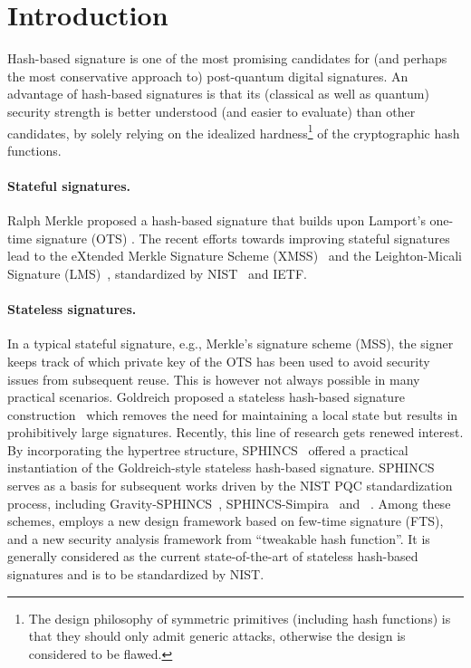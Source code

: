 \section{Introduction} \label{sec:intro}

Hash-based signature is one of the most promising candidates for (and perhaps the most conservative approach to)  post-quantum digital signatures. An advantage of hash-based signatures is that its (classical as well as quantum) security strength is better understood (and easier to evaluate) than other candidates, by solely relying on the idealized hardness\footnote{The design philosophy of symmetric primitives (including hash functions) is that they should only admit generic attacks, otherwise the design is considered to be flawed.} of the cryptographic hash functions.  

\paragraph{Stateful signatures.} Ralph Merkle proposed a hash-based signature \cite{C:Merkle89a} that builds upon Lamport's one-time signature (OTS) \cite{Lamport79}. The recent efforts towards improving stateful signatures lead to the eXtended Merkle Signature Scheme (XMSS)~\cite{hulsing2018xmss} and the Leighton-Micali Signature (LMS)~\cite{mcgrew2019leighton},  standardized by NIST~\cite{cooper2020recommendation} and IETF.

\paragraph{Stateless signatures.} In a typical stateful signature, e.g., Merkle's signature scheme (MSS), the signer keeps track of which private key of the OTS has been used to avoid security issues from subsequent reuse. This is however not always possible in many practical scenarios. Goldreich proposed a stateless hash-based signature construction~\cite{C:Goldreich86a,Goldreich04} which removes the need for maintaining a local state but results in prohibitively large signatures. Recently,  this line of research gets renewed interest. By incorporating the hypertree structure, SPHINCS~\cite{EC:BHHLNP15} offered a practical instantiation of the Goldreich-style stateless hash-based signature.  SPHINCS serves as a basis for subsequent works driven by the NIST PQC standardization process, including Gravity-SPHINCS~\cite{RSA:AumEnd18}, SPHINCS-Simpira~\cite{EPRINT:GueMou17} and \SPHINCSP\ \cite{CCS:BHKNRS19}. Among these schemes, \SPHINCSP employs a new design framework based on few-time signature (FTS), and a new security analysis framework from ``tweakable hash function''. It is generally considered as the current state-of-the-art of stateless hash-based signatures and is to be standardized by NIST.

